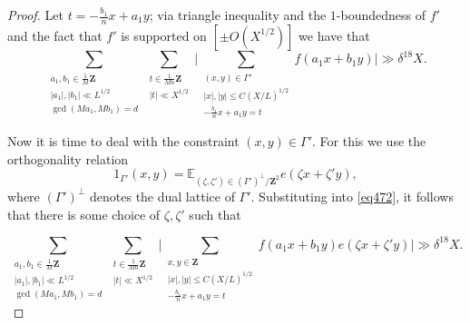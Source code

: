 \documentclass[11pt,reqno]{amsart}
\numberwithin{equation}{section}
\theoremstyle{definition}
\theoremstyle{remark}
\newcommand{\mb}{\mathbb}
\renewcommand{\le}{\leqslant}
\newcommand\Z{\mathbf{Z}}
\newcommand\E{\mb{E}}
\begin{document}
\begin{proof}
Let $t = -\frac{b_1}{n}x + a_1y$; via triangle inequality and the $1$-boundedness of $f'$ and the fact that $f'$ is supported on $[\pm O(X^{1/2})]$ we have that 
\begin{equation}\label{eq472}\sum_{\substack{a_1, b_1 \in \frac{1}{M}\Z \\ |a_1|, |b_1| \ll L^{1/2} \\ \gcd(Ma_1,Mb_1) = d}}\sum_{\substack{t\in \frac{1}{Mn} \Z\\ |t| \ll X^{1/2}}} \Big|\sum_{\substack{(x,y) \in \Gamma'  \\ |x|, |y| \le C(X/L)^{1/2} \\  -\frac{b_1}{n}x + a_1y = t}}f ( a_1x + b_1y)\Big|\gg \delta^{18} X.\end{equation}


Now it is time to deal with the constraint $(x, y) \in \Gamma'$. For this we use the orthogonality relation
\begin{equation}\label{gam-orth} 1_{\Gamma'}(x,y) = \E_{(\zeta, \zeta') \in (\Gamma')^{\perp}/\Z^2} e(\zeta x + \zeta' y),\end{equation} where $(\Gamma')^{\perp}$ denotes the dual lattice of $\Gamma'$. Substituting into \cref{eq472}, it follows that there is some choice of $\zeta, \zeta'$ such that 

\[\sum_{\substack{a_1, b_1 \in \frac{1}{M}\Z \\ |a_1|, |b_1| \ll L^{1/2} \\ \gcd(Ma_1,Mb_1) = d}}\sum_{\substack{t\in \frac{1}{Mn} \Z\\ |t| \ll X^{1/2}}} \Big|\sum_{\substack{x, y \in \Z  \\ |x|, |y| \le C(X/L)^{1/2} \\ -\frac{b_1}{n}x + a_1y = t}}f ( a_1x + b_1y) e(\zeta x + \zeta' y)\Big|\gg \delta^{18} X.\]




\end{proof}
\end{document}
